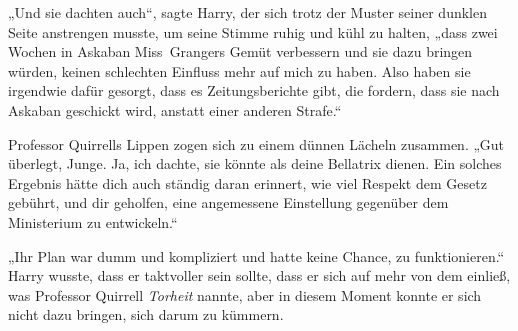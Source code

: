 „Und sie dachten auch“, sagte Harry, der sich trotz der Muster seiner dunklen Seite anstrengen musste, um seine Stimme ruhig und kühl zu halten, „dass zwei Wochen in Askaban Miss~Grangers Gemüt verbessern und sie dazu bringen würden, keinen schlechten Einfluss mehr auf mich zu haben. Also haben sie irgendwie dafür gesorgt, dass es Zeitungsberichte gibt, die fordern, dass sie nach Askaban geschickt wird, anstatt einer anderen Strafe.“

Professor Quirrells Lippen zogen sich zu einem dünnen Lächeln zusammen.
„Gut überlegt, Junge. Ja, ich dachte, sie könnte als deine Bellatrix dienen. Ein solches Ergebnis hätte dich auch ständig daran erinnert, wie viel Respekt dem Gesetz gebührt, und dir geholfen, eine angemessene Einstellung gegenüber dem Ministerium zu entwickeln.“

„Ihr Plan war dumm und kompliziert und hatte keine Chance, zu funktionieren.“
Harry wusste, dass er taktvoller sein sollte, dass er sich auf mehr von dem einließ, was Professor Quirrell \emph{Torheit} nannte, aber in diesem Moment konnte er sich nicht dazu bringen, sich darum zu kümmern.

